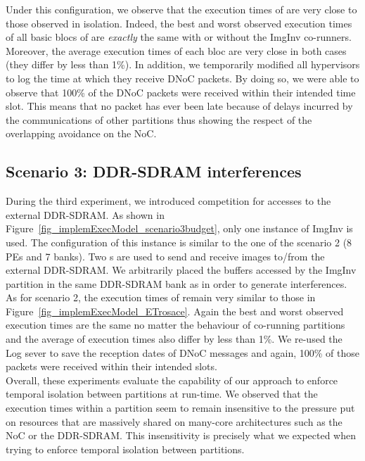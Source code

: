 \documentclass[main.tex]{subfiles}
\begin{document}
Under this configuration, we observe that the execution times of \rosace are very close to those observed in isolation. Indeed, the best and worst observed execution times of all basic blocs of \rosace are \emph{exactly} the same with or without the ImgInv co-runners. Moreover, the average execution times of each bloc are very close in both cases (they differ by less than 1\%). In addition, we temporarily modified all hypervisors to log the time at which they receive DNoC packets. By doing so, we were able to observe that 100\% of the DNoC packets were received within their intended time slot. This means that no packet has ever been late because of delays incurred by the communications of other partitions thus showing the respect of the overlapping avoidance on the NoC.

\subsection{Scenario 3: DDR-SDRAM interferences}
During the third experiment, we introduced competition for accesses to the external DDR-SDRAM. As shown in Figure~\ref{fig_implemExecModel_scenario3budget}, only one instance of ImgInv is used. The \PN{} configuration of this instance is similar to the one of the scenario 2 (8 PEs and 7 banks). Two \PC{}s are used to send and receive images to/from the external DDR-SDRAM. We arbitrarily placed the buffers accessed by the ImgInv partition in the same DDR-SDRAM bank as \rosace in order to generate interferences. As for scenario 2, the execution times of \rosace remain very similar to those in Figure~\ref{fig_implemExecModel_ETrosace}. Again the best and worst observed execution times are the same no matter the behaviour of co-running partitions and the average of execution times also differ by less than 1\%. We re-used the Log sever to save the reception dates of DNoC messages and again, 100\% of those packets were received within their intended slots. \\

Overall, these experiments evaluate the capability of our approach to enforce temporal isolation between partitions at run-time. We observed that the execution times within a partition seem to remain insensitive to the pressure put on resources that are massively shared on many-core architectures such as the NoC or the DDR-SDRAM. This insensitivity is precisely what we expected when trying to enforce temporal isolation between partitions. \\
\end{document}
